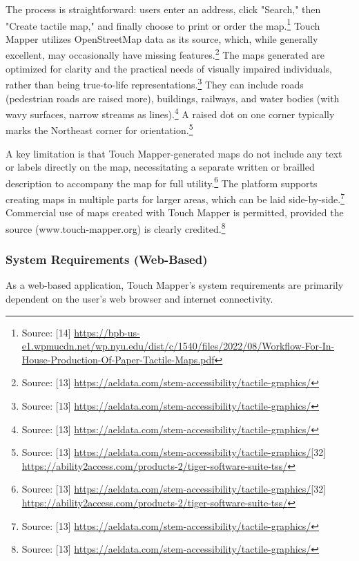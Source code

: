 The process is straightforward: users enter an address, click "Search," then "Create tactile map," and finally choose to print or order the map.\footnote{Source: [14] \url{https://bpb-us-e1.wpmucdn.net/wp.nyu.edu/dist/c/1540/files/2022/08/Workflow-For-In-House-Production-Of-Paper-Tactile-Maps.pdf}} Touch Mapper utilizes OpenStreetMap data as its source, which, while generally excellent, may occasionally have missing features.\footnote{Source: [13] \url{https://aeldata.com/stem-accessibility/tactile-graphics/}} The maps generated are optimized for clarity and the practical needs of visually impaired individuals, rather than being true-to-life representations.\footnote{Source: [13] \url{https://aeldata.com/stem-accessibility/tactile-graphics/}} They can include roads (pedestrian roads are raised more), buildings, railways, and water bodies (with wavy surfaces, narrow streams as lines).\footnote{Source: [13] \url{https://aeldata.com/stem-accessibility/tactile-graphics/}} A raised dot on one corner typically marks the Northeast corner for orientation.\footnote{Source: [13] \url{https://aeldata.com/stem-accessibility/tactile-graphics/}[32] \url{https://ability2access.com/products-2/tiger-software-suite-tss/}}

A key limitation is that Touch Mapper-generated maps do not include any text or labels directly on the map, necessitating a separate written or brailled description to accompany the map for full utility.\footnote{Source: [13] \url{https://aeldata.com/stem-accessibility/tactile-graphics/}[32] \url{https://ability2access.com/products-2/tiger-software-suite-tss/}} The platform supports creating maps in multiple parts for larger areas, which can be laid side-by-side.\footnote{Source: [13] \url{https://aeldata.com/stem-accessibility/tactile-graphics/}} Commercial use of maps created with Touch Mapper is permitted, provided the source (www.touch-mapper.org) is clearly credited.\footnote{Source: [13] \url{https://aeldata.com/stem-accessibility/tactile-graphics/}}

\subsubsection{System Requirements (Web-Based)}

As a web-based application, Touch Mapper's system requirements are primarily dependent on the user's web browser and internet connectivity.

